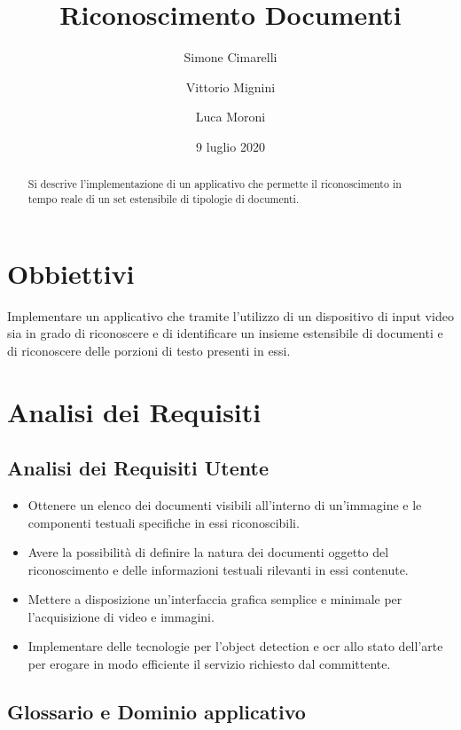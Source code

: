 \documentclass[12pt,a4paper]{article}
\title{Riconoscimento Documenti}
\author{Simone Cimarelli \and Vittorio Mignini \and Luca Moroni}
\date{9 luglio 2020}
\begin{document}
\maketitle

\begin{abstract}
    Si descrive l'implementazione di un applicativo che permette il
    riconoscimento in tempo reale di un set estensibile di tipologie di
    documenti.
\end{abstract}

\section{Obbiettivi}

Implementare un applicativo che tramite l'utilizzo di un dispositivo di
input video sia in grado di riconoscere e di identificare un insieme
estensibile di documenti e di riconoscere delle porzioni di testo
presenti in essi.

\section{Analisi dei Requisiti}
\subsection{Analisi dei Requisiti Utente}

\begin{itemize}
    \item Ottenere un elenco dei documenti visibili all'interno di
        un'immagine e le componenti testuali specifiche in essi
        riconoscibili.
    \item Avere la possibilità di definire la natura dei documenti
        oggetto del riconoscimento e delle informazioni testuali
        rilevanti in essi contenute.
    \item Mettere a disposizione un'interfaccia grafica semplice e
        minimale per l'acquisizione di video e immagini.
    \item Implementare delle tecnologie per l'object detection e ocr
        allo stato dell'arte per erogare in modo efficiente il servizio
        richiesto dal committente.
\end{itemize}

\subsection{Glossario e Dominio applicativo}
\end{document}
